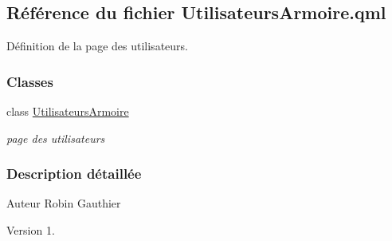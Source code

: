 \hypertarget{_utilisateurs_armoire_8qml}{}\subsection{Référence du fichier Utilisateurs\+Armoire.\+qml}
\label{_utilisateurs_armoire_8qml}


Définition de la page des utilisateurs.  


\subsubsection*{Classes}
\begin{DoxyCompactItemize}
\item 
class \hyperlink{class_utilisateurs_armoire}{Utilisateurs\+Armoire}
\begin{DoxyCompactList}\small\item\em page des utilisateurs \end{DoxyCompactList}\end{DoxyCompactItemize}


\subsubsection{Description détaillée}
\begin{DoxyAuthor}{Auteur}
Robin Gauthier
\end{DoxyAuthor}
\begin{DoxyVersion}{Version}
1. 
\end{DoxyVersion}
